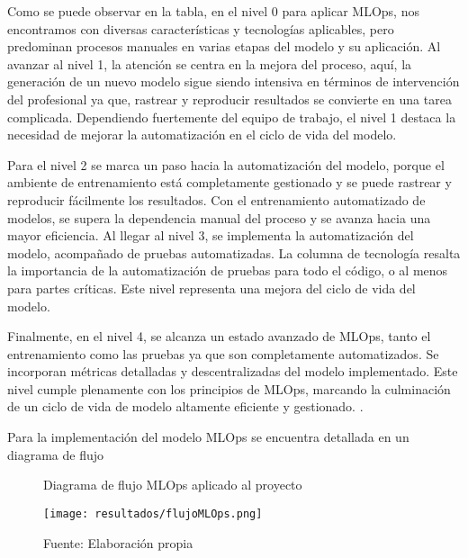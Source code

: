 \newpage

Como se puede observar en la tabla, en el nivel 0 para aplicar MLOps, nos encontramos con diversas características y tecnologías aplicables, pero predominan procesos manuales en varias etapas del modelo y su aplicación. Al avanzar al nivel 1, la atención se centra en la mejora del proceso, aquí, la generación de un nuevo modelo sigue siendo intensiva en términos de intervención del profesional ya que, rastrear y reproducir resultados se convierte en una tarea complicada. Dependiendo fuertemente del equipo de trabajo, el nivel 1 destaca la necesidad de mejorar la automatización en el ciclo de vida del modelo. \newline

Para el nivel 2 se marca un paso hacia la automatización del modelo, porque el ambiente de entrenamiento está completamente gestionado y se puede rastrear y reproducir fácilmente los resultados. Con el entrenamiento automatizado de modelos, se supera la dependencia manual del proceso y se avanza hacia una mayor eficiencia. Al llegar al nivel 3, se implementa la automatización del modelo, acompañado de pruebas automatizadas. La columna de tecnología resalta la importancia de la automatización de pruebas para todo el código, o al menos para partes críticas. Este nivel representa una mejora del ciclo de vida del modelo. \newline

Finalmente, en el nivel 4, se alcanza un estado avanzado de MLOps, tanto el entrenamiento como las pruebas ya que son completamente automatizados. Se incorporan métricas detalladas y descentralizadas del modelo implementado. Este nivel cumple plenamente con los principios de MLOps, marcando la culminación de un ciclo de vida de modelo altamente eficiente y gestionado. \citep{rivero2022, visengeriyeva2020}.

Para la implementación del modelo MLOps se encuentra detallada en un diagrama de flujo

\newpage

\begin{landscape}
	\thispagestyle{empty}
	\begin{figure}[htbp]
		\centering
		\caption{Diagrama de flujo MLOps aplicado al proyecto}
		\texttt{[image: resultados/flujoMLOps.png]}
		\caption*{\footnotesize Fuente: Elaboración propia}
		\label{fig:figuraFlujoMLOps}
	\end{figure}
\end{landscape}

